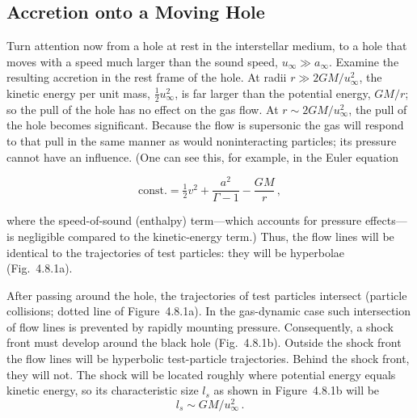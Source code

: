 

\subsection{Accretion onto a Moving Hole}
\label{sec:4.8}

Turn attention now from a hole at rest in the interstellar medium, to a hole that
moves with a speed much larger than the sound speed, $u_\infty \gg a_\infty$. Examine the
resulting accretion in the rest frame of the hole. At radii $r \gg 2GM/u_\infty^2$, the kinetic
energy per unit mass, $\frac{1}{2}u_\infty^2$, is far larger than the potential energy, $GM/r$; so the
pull of the hole has no effect on the gas flow. At $r \sim 2GM/u_\infty^2$, the pull of the
hole becomes significant. Because the flow is supersonic the gas will respond to
that pull in the same manner as would noninteracting particles; its pressure
cannot have an influence. (One can see this, for example, in the Euler equation

\begin{equation}
\text{const.} = \tfrac{1}{2}v^2 + \frac{a^2}{\Gamma - 1} - \frac{GM}{r}\,,
\tag{4.8.1}
\end{equation}

where the speed-of-sound (enthalpy) term---which accounts for pressure effects---is
negligible compared to the kinetic-energy term.) Thus, the flow lines will be
identical to the trajectories of test particles: they will be hyperbolae
(Fig.~4.8.1a).

After passing around the hole, the trajectories of test particles intersect
(particle collisions; dotted line of Figure~4.8.1a). In the gas-dynamic case such
intersection of flow lines is prevented by rapidly mounting pressure. Consequently,
a shock front must develop around the black hole (Fig.~4.8.1b).
Outside the shock front the flow lines will be hyperbolic test-particle trajectories.
Behind the shock front, they will not. The shock will be located roughly where
potential energy equals kinetic energy, so its characteristic size $l_s$ as shown in
Figure~4.8.1b will be
\begin{equation}
l_s \sim GM/u_\infty^2\,.
\tag{4.8.2}
\end{equation}

